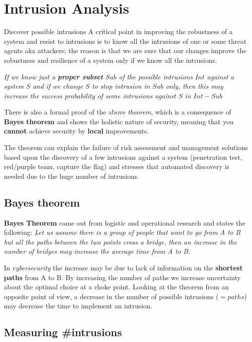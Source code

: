 \chapter{Intrusion Analysis}

Discover possible intrusions
A critical point in improving the robustness of a system and resist to intrusions
is to know all the intrusions of one or some threat agents aka attackers;
the reason is that we are sure that our changes improve the robustness and
resilience of a system only if we know all the intrusions.

\begin{center}
   \color{gray}
   \textit{If we know just a \textbf{proper subset} $Sub$ of the possible intrusions $Int$ against a system
   $S$ and if we change $S$ to stop intrusion in $Sub$ only, then this may increase the
   success probability of some intrusions against $S$ in $Int-Sub$}
\end{center}
There is also a formal proof of the above \textit{theorem},
which is a consequence of \textbf{Bayes theorem} and shows the holistic nature of
security,
meaning that you \textbf{cannot} achieve security by \textbf{local} improvements.

The theorem can explain the failure of risk assessment and management solutions
based upon the discovery of a few intrusions against a system (penetration test,
red/purple team, capture the flag) and stresses that automated discovery is needed due to the huge number of intrusions.

\section{Bayes theorem}
\textbf{Bayes Theorem} came out from logistic and operational research and states the following:
\emph{Let us assume there is a group of people that want to go from A to B but all the paths between the two points cross a bridge,
then an increase in the number of bridges may increase the
average time from A to B.}

In \textit{cybersecurity} the increase may be due to lack of information on the \textbf{shortest paths} from A to B.
By increasing the number of paths we increase uncertainty
about the optimal choice at a choke point.
Looking at the theorem from an opposite point of view, a decrease in the number of possible
intrusions ($=paths$) may decrease the time to implement an intrusion.

\section{Measuring \#intrusions}

